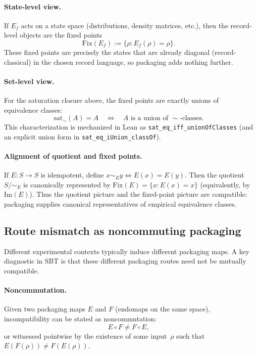 \documentclass[11pt]{article}
\begin{document}
\paragraph{State-level view.}
If $E_f$ acts on a state space (distributions, density matrices, etc.), then the record-level objects are the fixed points
\[
\mathrm{Fix}(E_f) := \{\rho : E_f(\rho)=\rho\}.
\]
These fixed points are precisely the states that are already diagonal (record-classical) in the chosen record language, so packaging adds nothing further.

\paragraph{Set-level view.}
For the saturation closure above, the fixed points are exactly unions of equivalence classes:
\[
\mathrm{sat}_\sim(A)=A \quad\Longleftrightarrow\quad
\text{$A$ is a union of $\sim$-classes.}
\]
This characterization is mechanized in Lean as \texttt{sat\_eq\_iff\_unionOfClasses} (and an explicit union form in \texttt{sat\_eq\_iUnion\_classOf}).

\paragraph{Alignment of quotient and fixed points.}
If $E:S\to S$ is idempotent, define $x\sim_E y \iff E(x)=E(y)$. Then the quotient $S/{\sim_E}$ is canonically represented by $\mathrm{Fix}(E)=\{x:E(x)=x\}$ (equivalently, by $\mathrm{Im}(E)$). Thus the quotient picture and the fixed-point picture are compatible: packaging supplies canonical representatives of empirical equivalence classes.

\subsection{Route mismatch as noncommuting packaging}

Different experimental contexts typically induce different packaging maps.
A key diagnostic in SBT is that these different packaging routes need not be mutually compatible.

\paragraph{Noncommutation.}
Given two packaging maps $E$ and $F$ (endomaps on the same space), incompatibility can be stated as noncommutation:
\[
E\circ F \neq F\circ E,
\]
or witnessed pointwise by the existence of some input~$\rho$ such that $E(F(\rho))\neq F(E(\rho))$.
\end{document}
